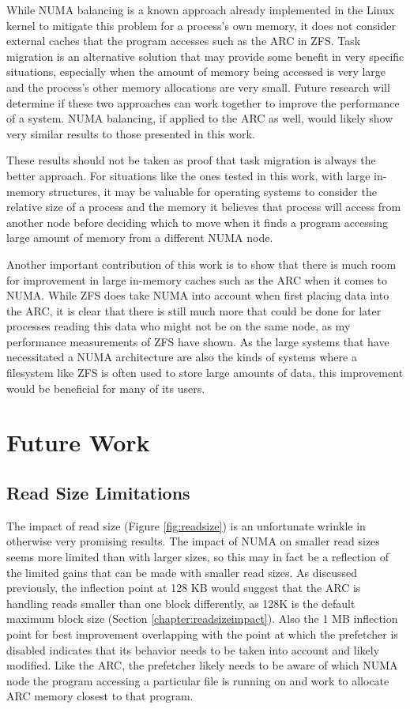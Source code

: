 While NUMA balancing is a known approach already implemented in the Linux kernel to mitigate this problem for a process's
own memory, it does not consider external caches that the program accesses such as the ARC in ZFS.
Task migration is an alternative solution that may provide some benefit in very specific situations,
especially when the amount of memory being accessed is very large and the process's other memory allocations are very small.
Future research will determine if these two approaches can work together to improve the performance of a system.
NUMA balancing, if applied to the ARC as well, would likely show very similar results to those presented in this work.

These results should not be taken as proof that task migration is always the better approach.
For situations like the ones tested in this work, with large in-memory structures, 
it may be valuable for operating systems to consider the relative size of a process and the memory it believes that process will
access from another node before deciding which to move when it finds a program accessing large amount of memory from a different
NUMA node. 

Another important contribution of this work is to show that there is much room for improvement in large in-memory caches such as
the ARC when it comes to NUMA.
While ZFS does take NUMA into account when first placing data into the ARC, it is clear that there is still much more that could be done 
for later processes reading this data who might not be on the same node, as my performance measurements of ZFS have shown.
As the large systems that have necessitated a NUMA architecture are also the kinds of systems where a filesystem like ZFS is often
used to store large amounts of data, this improvement would be beneficial for many of its users.

\section{Future Work}

\subsection{Read Size Limitations}
The impact of read size (Figure \ref{fig:readsize}) is an unfortunate wrinkle in otherwise very promising results.
The impact of NUMA on smaller read sizes seems more limited than with larger sizes, so this may in fact be a reflection of the limited
gains that can be made with smaller read sizes.
As discussed previously, the inflection point at 128 KB would suggest that the ARC is handling reads smaller than one block differently,
as 128K is the default maximum block size (Section \ref{chapter:readsizeimpact}).
Also the 1 MB inflection point for best improvement overlapping with the point at which the prefetcher is disabled indicates that
its behavior needs to be taken into account and likely modified.
Like the ARC, the prefetcher likely needs to be aware of which NUMA node the program accessing a particular file is running
on and work to allocate ARC memory closest to that program.


